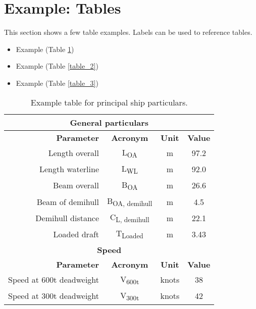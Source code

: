\section{Example: Tables}
\label{sec13}


This section shows a few table examples. Labels can be used to reference tables.
\begin{itemize}
	\item Example (Table \ref{table_1})
	\item Example (Table \ref{table_2})
	\item Example (Table \ref{table_3})	
\end{itemize}

\begin{table}[hbtp]
	\centering
	\caption{Example table for principal ship particulars.}
	\label{table_1}		
	\begin{tabular}{r|c|c|c}
		\toprule
		\multicolumn{4}{c}{\textbf{General particulars}} \\
		\midrule 
		\textbf{Parameter} & \textbf{Acronym} & \textbf{Unit} & \textbf{Value} \\ 
		\midrule 
		Length overall 		& L\textsubscript{OA}   		& m     & 97.2 \\
		Length waterline 	& L\textsubscript{WL}   		& m     & 92.0 \\
		Beam overall 		& B\textsubscript{OA}   		& m     & 26.6 \\
		Beam of demihull 	& B\textsubscript{OA, demihull} & m     & 4.5 \\
		Demihull distance 	& C\textsubscript{L, demihull} 	& m     & 22.1 \\
		Loaded draft 		& T\textsubscript{Loaded} 		& m     & 3.43 \\
		\midrule 	    
		\multicolumn{4}{c}{\textbf{Speed}} \\
		\midrule 
		\textbf{Parameter} & \textbf{Acronym} & \textbf{Unit} & \textbf{Value} \\
		\midrule 	
		Speed at 600t deadweight 	& V\textsubscript{600t}	 & knots 	& 38 \\
		Speed at 300t deadweight	& V\textsubscript{300t}  & knots   	& 42 \\
		\bottomrule
	\end{tabular}
\end{table}

